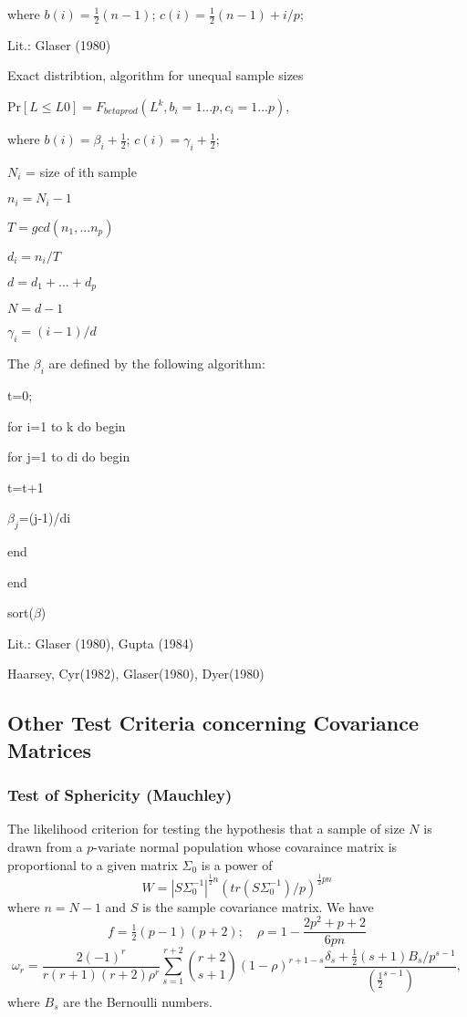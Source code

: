 where $b(i)=\tfrac{1}{2}(n-1)$;   $c(i)=\tfrac{1}{2}(n-1)+i/p$;

Lit.: Glaser (1980)


\vpara
Exact distribtion, algorithm for unequal sample sizes

Pr$[L \leq L0] = F_{betaprod}(L^k,b_i=1...p,c_i=1...p)$,

where $b(i)=\beta_i + \tfrac{1}{2}$;   $c(i)=\gamma_i + \tfrac{1}{2}$;

$N_i$ = size of ith sample

$n_i = N_i-1$

$T  = gcd(n_1,...n_p)$

$d_i = n_i/T$

$d  = d_1 + ... + d_p$

$N  = d-1$

$\gamma_i=(i-1)/d$


\vpara
The $\beta_i$ are defined by the following algorithm:

t=0;

for i=1 to k do begin

for j=1 to di do begin

t=t+1

$\beta_j$=(j-1)/di

end

end

sort($\beta$)

\vpara
Lit.: Glaser (1980), Gupta (1984)


\cite{Nagarsenker_1984}


Haarsey, 	Cyr(1982), 	Glaser(1980), 	Dyer(1980)





\subsection{Other Test Criteria concerning Covariance Matrices}
\label{BoxDavis:Other Test Criteria concerning Covariance Matrices}



\subsubsection{Test of Sphericity (Mauchley)}
The likelihood criterion for testing the hypothesis that a sample of size $N$ is drawn from a $p$-variate normal population whose covaraince matrix is proportional to a given matrix $\Sigma_0$ is a power of
\begin{equation}
	W = |S \Sigma_0^{-1}|^{\tfrac{1}{2}n} \left(tr(S \Sigma_0^{-1})/p \right)^{\tfrac{1}{2}pn}
\end{equation}
where $n=N-1$ and $S$ is the sample covariance matrix. We have
\begin{equation}
	f=\tfrac{1}{2}(p-1)(p+2); \quad \rho=1-\frac{2p^2+p+2}{6pn}
\end{equation}
\begin{equation}
	\omega_r = \frac{2(-1)^r}{r(r+1)(r+2) \rho^r} \sum_{s=1}^{r+2} \binom{r+2}{s+1} (1-\rho)^{r+1-s} \frac{\delta_s + \tfrac{1}{2}(s+1) B_s / p^{s-1}}{(\tfrac{1}{2}^{s-1})}, 
\end{equation}
where $B_s$ are the Bernoulli numbers.


